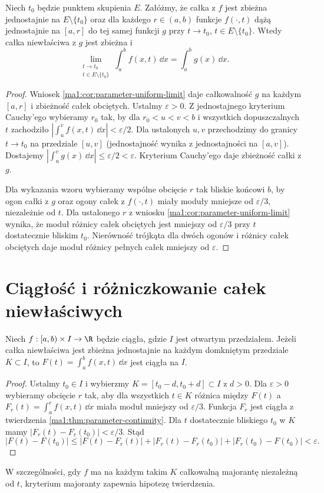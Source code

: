 \begin{twierdzenie}
\label{ma1:thm:improper-parameter-limit}
Niech $t_0$ będzie punktem skupienia $E$. Załóżmy, że całka z $f$ jest zbieżna jednostajnie na $E\setminus\{t_0\}$ oraz dla każdego $r\in(a,b)$ funkcje $f(\cdot,t)$ dążą jednostajnie na $[a,r]$ do tej samej funkcji $g$ przy $t\to t_0$, $t\in E\setminus\{t_0\}$. Wtedy całka niewłaściwa z $g$ jest zbieżna i
\[
 \lim_{\substack{t\to t_0\\t\in E\setminus\{t_0\}}}
 \int_a^b f(x,t)\,\dd x=\int_a^b g(x)\,\dd x.
\]
\end{twierdzenie}
\begin{proof}
Wniosek \ref{ma1:cor:parameter-uniform-limit} daje całkowalność $g$ na każdym $[a,r]$ i zbieżność całek obciętych. Ustalmy $\varepsilon>0$. Z jednostajnego kryterium Cauchy'ego wybieramy $r_0$ tak, by dla $r_0<u<v<b$ i wszystkich dopuszczalnych $t$ zachodziło $|\int_u^v f(x,t)\,\dd x|<\varepsilon/2$. Dla ustalonych $u,v$ przechodzimy do granicy $t\to t_0$ na przedziale $[u,v]$ (jednostajność wynika z jednostajności na $[a,v]$). Dostajemy $|\int_u^v g(x)\,\dd x|\le\varepsilon/2<\varepsilon$. Kryterium Cauchy'ego daje zbieżność całki z $g$.

Dla wykazania wzoru wybieramy wspólne obcięcie $r$ tak bliskie końcowi $b$, by ogon całki z $g$ oraz ogony całek z $f(\cdot,t)$ miały moduły mniejsze od $\varepsilon/3$, niezależnie od $t$. Dla ustalonego $r$ z wniosku \ref{ma1:cor:parameter-uniform-limit} wynika, że moduł różnicy całek obciętych jest mniejszy od $\varepsilon/3$ przy $t$ dostatecznie bliskim $t_0$. Nierówność trójkąta dla dwóch ogonów i różnicy całek obciętych daje moduł różnicy pełnych całek mniejszy od $\varepsilon$.
\end{proof}

\section{Ciągłość i różniczkowanie całek niewłaściwych}
\begin{twierdzenie}
\label{ma1:thm:improper-parameter-continuity}
Niech $f:[a,b)\times I\to\R$ będzie ciągła, gdzie $I$ jest otwartym przedziałem. Jeżeli całka niewłaściwa jest zbieżna jednostajnie na każdym domkniętym przedziale $K\subset I$, to $F(t)=\int_a^b f(x,t)\,\dd x$ jest ciągła na $I$.
\end{twierdzenie}
\begin{proof}
Ustalmy $t_0\in I$ i wybierzmy $K=[t_0-d,t_0+d]\subset I$ z $d>0$. Dla $\varepsilon>0$ wybieramy obcięcie $r$ tak, aby dla wszystkich $t\in K$ różnica między $F(t)$ a $F_r(t)=\int_a^r f(x,t)\,\dd x$ miała moduł mniejszy od $\varepsilon/3$. Funkcja $F_r$ jest ciągła z twierdzenia \ref{ma1:thm:parameter-continuity}. Dla $t$ dostatecznie bliskiego $t_0$ w $K$ mamy $|F_r(t)-F_r(t_0)|<\varepsilon/3$. Stąd
\[
 |F(t)-F(t_0)|\le |F(t)-F_r(t)|+|F_r(t)-F_r(t_0)|
 +|F_r(t_0)-F(t_0)|<\varepsilon.
\]
\end{proof}
W szczególności, gdy $f$ ma na każdym takim $K$ całkowalną majorantę niezależną od $t$, kryterium majoranty zapewnia hipotezę twierdzenia.

